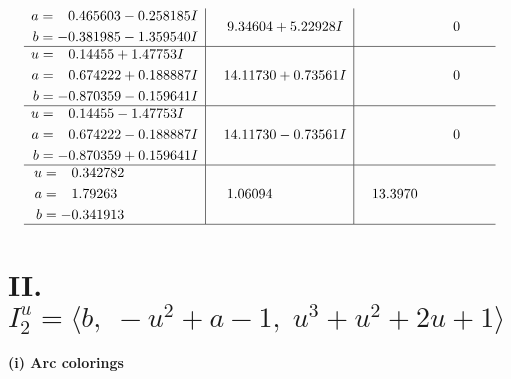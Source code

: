 \documentclass[1p]{elsarticle_modified}
\theoremstyle{definition}
\begin{document}
$$\begin{array}{c|c|c}
\begin{aligned}
a &= \phantom{-}0.465603 - 0.258185 I \\
b &= -0.381985 - 1.359540 I\end{aligned}
 & \phantom{-}9.34604 + 5.22928 I & \phantom{-0.000000 } 0 \\ \hline\begin{aligned}
u &= \phantom{-}0.14455 + 1.47753 I \\
a &= \phantom{-}0.674222 + 0.188887 I \\
b &= -0.870359 - 0.159641 I\end{aligned}
 & \phantom{-}14.11730 + 0.73561 I & \phantom{-0.000000 } 0 \\ \hline\begin{aligned}
u &= \phantom{-}0.14455 - 1.47753 I \\
a &= \phantom{-}0.674222 - 0.188887 I \\
b &= -0.870359 + 0.159641 I\end{aligned}
 & \phantom{-}14.11730 - 0.73561 I & \phantom{-0.000000 } 0 \\ \hline\begin{aligned}
u &= \phantom{-}0.342782\phantom{ +0.000000I} \\
a &= \phantom{-}1.79263\phantom{ +0.000000I} \\
b &= -0.341913\phantom{ +0.000000I}\end{aligned}
 & \phantom{-}1.06094\phantom{ +0.000000I} & \phantom{-}13.3970\phantom{ +0.000000I}\\
 \hline 
 \end{array}$$\newpage\newpage\renewcommand{\arraystretch}{1}
\centering \section*{II. $I^u_{2}= \langle b,\;- u^2+a-1,\;u^3+u^2+2 u+1 \rangle$}
\flushleft \textbf{(i) Arc colorings}\\
\end{document}
